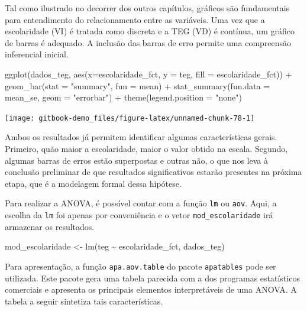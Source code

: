 \documentclass[
]{book}
\newenvironment{Shaded}{\begin{snugshade}}{\end{snugshade}}
\newcommand{\AttributeTok}[1]{\textcolor[rgb]{0.77,0.63,0.00}{#1}}
\newcommand{\FunctionTok}[1]{\textcolor[rgb]{0.00,0.00,0.00}{#1}}
\newcommand{\NormalTok}[1]{#1}
\newcommand{\OtherTok}[1]{\textcolor[rgb]{0.56,0.35,0.01}{#1}}
\newcommand{\SpecialCharTok}[1]{\textcolor[rgb]{0.00,0.00,0.00}{#1}}
\newcommand{\StringTok}[1]{\textcolor[rgb]{0.31,0.60,0.02}{#1}}
\begin{document}
Tal como ilustrado no decorrer dos outros capítulos, gráficos são fundamentais para entendimento do relacionamento entre as variáveis. Uma vez que a escolaridade (VI) é tratada como discreta e a TEG (VD) é contínua, um gráfico de barras é adequado. A inclusão das barras de erro permite uma compreensão inferencial inicial.

\begin{Shaded}
\begin{Highlighting}[]
\FunctionTok{ggplot}\NormalTok{(dados\_teg, }\FunctionTok{aes}\NormalTok{(}\AttributeTok{x=}\NormalTok{escolaridade\_fct, }\AttributeTok{y =}\NormalTok{ teg, }\AttributeTok{fill =}\NormalTok{ escolaridade\_fct)) }\SpecialCharTok{+}
  \FunctionTok{geom\_bar}\NormalTok{(}\AttributeTok{stat =} \StringTok{"summary"}\NormalTok{, }\AttributeTok{fun =}\NormalTok{ mean) }\SpecialCharTok{+}
  \FunctionTok{stat\_summary}\NormalTok{(}\AttributeTok{fun.data =}\NormalTok{ mean\_se, }\AttributeTok{geom =} \StringTok{"errorbar"}\NormalTok{) }\SpecialCharTok{+}
  \FunctionTok{theme}\NormalTok{(}\AttributeTok{legend.position =} \StringTok{"none"}\NormalTok{)}
\end{Highlighting}
\end{Shaded}

\begin{center}\texttt{[image: gitbook-demo\_files/figure-latex/unnamed-chunk-78-1]} \end{center}

Ambos os resultados já permitem identificar algumas características gerais. Primeiro, quão maior a escolaridade, maior o valor obtido na escala. Segundo, algumas barras de erros estão superpostas e outras não, o que nos leva à conclusão preliminar de que resultados significativos estarão presentes na próxima etapa, que é a modelagem formal dessa hipótese.

Para realizar a ANOVA, é possível contar com a função \texttt{lm} ou \texttt{aov}. Aqui, a escolha da \texttt{lm} foi apenas por conveniência e o vetor \texttt{mod\_escolaridade} irá armazenar os resultados.

\begin{Shaded}
\begin{Highlighting}[]
\NormalTok{mod\_escolaridade }\OtherTok{\textless{}{-}} \FunctionTok{lm}\NormalTok{(teg }\SpecialCharTok{\textasciitilde{}}\NormalTok{ escolaridade\_fct, dados\_teg)}
\end{Highlighting}
\end{Shaded}

Para apresentação, a função \texttt{apa.aov.table} do pacote \texttt{apatables} pode ser utilizada. Este pacote gera uma tabela parecida com a dos programas estatísticos comerciais e apresenta os principais elementos interpretáveis de uma ANOVA. A tabela a seguir sintetiza tais características.
\end{document}
